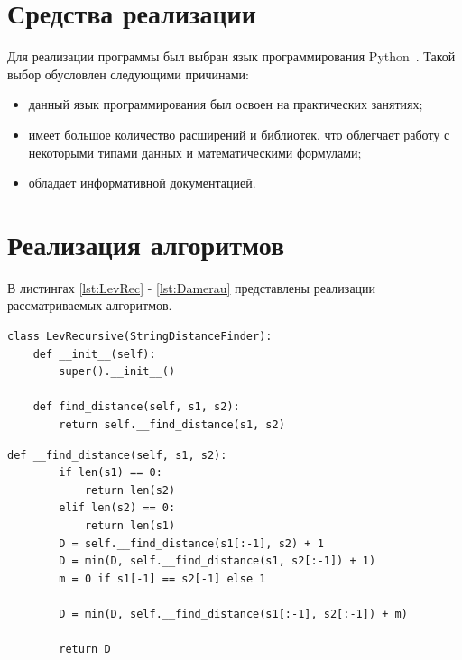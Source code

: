 \documentclass[a4paper,oneside,14pt]{extreport}
\begin{document}
\section{Средства реализации}
Для реализации программы был выбран язык программирования Python~\cite{python}. Такой выбор обусловлен следующими причинами:
\begin{itemize}
	\item данный язык программирования был освоен на практических занятиях;
	\item имеет большое количество расширений и библиотек, что облегчает работу с некоторыми типами данных и математическими формулами;
	\item обладает информативной документацией.
\end{itemize}

\section{Реализация алгоритмов}
В листингах \ref{lst:LevRec} - \ref{lst:Damerau} представлены реализации рассматриваемых алгоритмов.
\captionsetup{singlelinecheck=false}
\begin{lstlisting}[caption=Рекурсивный алгоритм вычисления расстояния Левенштейна (часть 1), label={lst:LevRec}]
class LevRecursive(StringDistanceFinder):
	def __init__(self):
		super().__init__()
	
	def find_distance(self, s1, s2):
		return self.__find_distance(s1, s2)
\end{lstlisting}
\begin{lstlisting}[caption=Рекурсивный алгоритм вычисления расстояния Левенштейна (часть 2), label={lst:LevRec}]
	def __find_distance(self, s1, s2):
		if len(s1) == 0:
			return len(s2)
		elif len(s2) == 0:
			return len(s1)
		D = self.__find_distance(s1[:-1], s2) + 1
		D = min(D, self.__find_distance(s1, s2[:-1]) + 1)
		m = 0 if s1[-1] == s2[-1] else 1
		
		D = min(D, self.__find_distance(s1[:-1], s2[:-1]) + m)
		
		return D

\end{lstlisting}
\end{document}
